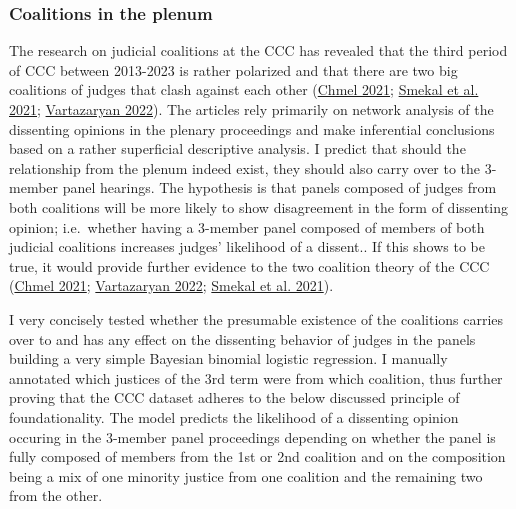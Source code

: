 \documentclass[
  11pt,
]{article}
\begin{document}
\hypertarget{coalitions-in-the-plenum}{%
\subsubsection{Coalitions in the
plenum}\label{coalitions-in-the-plenum}}

The research on judicial coalitions at the CCC has revealed that the
third period of CCC between 2013-2023 is rather polarized and that there
are two big coalitions of judges that clash against each other
(\protect\hyperlink{ref-chmelCoOvlivnujeUstavni2021}{Chmel 2021};
\protect\hyperlink{ref-smekalMimopravniVlivyNa2021}{Smekal et al. 2021};
\protect\hyperlink{ref-vartazaryanSitOvaAnalyza2022}{Vartazaryan 2022}).
The articles rely primarily on network analysis of the dissenting
opinions in the plenary proceedings and make inferential conclusions
based on a rather superficial descriptive analysis. I predict that
should the relationship from the plenum indeed exist, they should also
carry over to the 3-member panel hearings. The hypothesis is that panels
composed of judges from both coalitions will be more likely to show
disagreement in the form of dissenting opinion; i.e.~whether having a
3-member panel composed of members of both judicial coalitions increases
judges' likelihood of a dissent.. If this shows to be true, it would
provide further evidence to the two coalition theory of the CCC
(\protect\hyperlink{ref-chmelCoOvlivnujeUstavni2021}{Chmel 2021};
\protect\hyperlink{ref-vartazaryanSitOvaAnalyza2022}{Vartazaryan 2022};
\protect\hyperlink{ref-smekalMimopravniVlivyNa2021}{Smekal et al.
2021}).

I very concisely tested whether the presumable existence of the
coalitions carries over to and has any effect on the dissenting behavior
of judges in the panels building a very simple Bayesian binomial
logistic regression. I manually annotated which justices of the 3rd term
were from which coalition, thus further proving that the CCC dataset
adheres to the below discussed principle of foundationality. The model
predicts the likelihood of a dissenting opinion occuring in the 3-member
panel proceedings depending on whether the panel is fully composed of
members from the 1st or 2nd coalition and on the composition being a mix
of one minority justice from one coalition and the remaining two from
the other.
\end{document}
